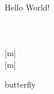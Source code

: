 \documentclass{article}
\newcommand{\comm}[1]{Hello #1!}
\begin{document}
\comm{World} \\
 \\

 \\
 \\
[m] \\
[m]

\begin{foo}
	butterfly
\end{foo}
\end{document}
